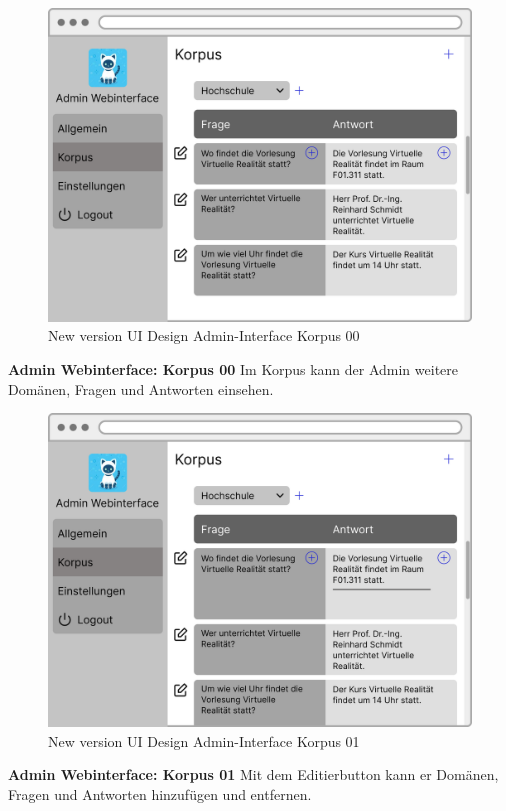 \begin{figure}[H]
    \centering
    \includegraphics[width=1.0\textwidth]{bilder/new vers. UI Design/Korpus/Admin Interface 00.png}
    \caption{New version UI Design Admin-Interface Korpus 00}
    \label{fig:New version UI Design Admin-Interface Korpus 00}
\end{figure}
\noindent  \textbf{Admin Webinterface: Korpus 00} \newline
Im Korpus kann der Admin weitere Domänen, Fragen und Antworten einsehen.

\begin{figure}[H]
    \centering
    \includegraphics[width=1.0\textwidth]{bilder/new vers. UI Design/Korpus/Admin Interface 01.png}
    \caption{New version UI Design Admin-Interface Korpus 01}
    \label{fig:New version UI Design Admin-Interface Korpus 01}
\end{figure}
\noindent \textbf{Admin Webinterface: Korpus 01} \newline
Mit dem Editierbutton kann er Domänen, Fragen und Antworten hinzufügen und entfernen.

